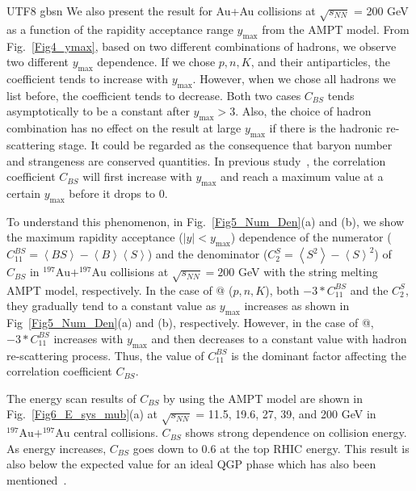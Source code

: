 \documentclass[twocolumn,showpacs,preprintnumbers,amsmath,amssymb]{revtex4-1}
\makeatletter
\newcommand{\Rmnum}[1]{\expandafter\@slowromancap\romannumeral #1@}
\makeatother
\begin{document}
\begin{CJK*} {UTF8} {gbsn}
		We also present the result for Au+Au collisions at $\sqrt{s_{NN}}$ = 200 GeV as a function of the rapidity acceptance range $y_{\text{max}}$ from the AMPT model.
	From Fig.~\ref{Fig4_ymax}, based on two different combinations of hadrons, we observe two different $y_{\text{max}}$ dependence.
	If we chose $p, n, K$, and their antiparticles, the coefficient tends to increase with  $y_{\text{max}}$.
	However, when we chose all hadrons we list before, the coefficient tends to decrease.
	Both two cases $C_{BS}$ tends  asymptotically to be a constant after $y_{\text{max}}>3$.
	Also, the choice of hadron combination has no effect on the result at large $y_{\text{max}}$ if there is the hadronic re-scattering stage.
	It could be regarded as the consequence that baryon number and strangeness are conserved quantities. In previous study~\cite{Koch_origin}, the correlation coefficient $C_{BS}$ will first increase with $y_{\text{max}}$  
	and reach a maximum value at a certain $y_{\text{max}}$ before it drops to 0.
	

	{\color{blue}To understand this phenomenon}, in Fig.~\ref{Fig5_Num_Den}(a) and (b), we show the maximum rapidity acceptance ($|y|<y_{\text{max}}$) dependence of the numerator ($C_{11}^{BS}= \left\langle BS \right\rangle - \left\langle B \right\rangle \left\langle S \right\rangle$) and the denominator ($C_{2}^{S}= \left\langle  S^{2} \right\rangle -\left\langle S \right\rangle^{2}$) of $C_{BS}$ in $\mathrm{^{197}Au+^{197}Au}$ collisions at $\sqrt{s_{NN}} = 200$ GeV with the string melting AMPT model, respectively. In the case of \Rmnum{2} ($p, n, K$), both $-3*C_{11}^{BS}$ and the $C_{2}^{S}$, they gradually tend to a constant value as $y_{\text{max}}$ increases as shown in Fig~\ref{Fig5_Num_Den}(a) and (b), respectively. However, in the case of \Rmnum{1}, $-3*C_{11}^{BS}$ increases with $y_{\text{max}}$ and then decreases to a constant value with hadron re-scattering process. { }Thus, the value of $C_{11}^{BS}$ is the dominant factor affecting the correlation coefficient $C_{BS}$.
	
		
	\par
	The energy scan results of $C_{BS}$ by using the AMPT model are shown in Fig.~\ref{Fig6_E_sys_mub}(a) at $\sqrt{s_{NN}}$ = 11.5, 19.6, 27, 39, and 200 GeV in $\mathrm{^{197}Au+^{197}Au}$ central collisions.
	$C_{BS}$ shows strong dependence on collision energy.
	As energy increases, $C_{BS}$ goes down to 0.6 at the top RHIC energy.
	This result is also below the expected value for an ideal QGP phase which has also been mentioned~\cite{Haussler_2007}.
	


\end{CJK*}
\end{document}
